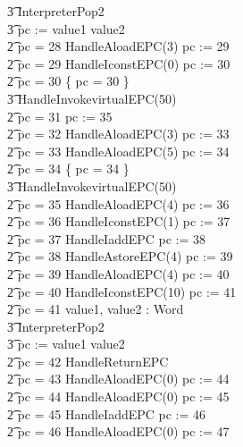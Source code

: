\begin{figure}[tp!]
\begin{minipage}{0.5\textwidth}
{\begin{circus}
    \t3 InterpreterPop2 \circseq \\
    \t3 pc := \IF value1 \leq value2   \\
    \t2 {} \circelse pc = 28 \circthen HandleAloadEPC(3) \circseq pc := 29 \\
    \t2 {} \circelse pc = 29 \circthen HandleIconstEPC(0) \circseq pc := 30 \\
    \t2 {} \circelse pc = 30 \circthen \{ pc = 30 \} \circseq \\
    \t3 HandleInvokevirtualEPC(50) \\
    \t2 {} \circelse pc = 31 \circthen pc := 35 \\
    \t2 {} \circelse pc = 32 \circthen HandleAloadEPC(3) \circseq pc := 33 \\
    \t2 {} \circelse pc = 33 \circthen HandleAloadEPC(5) \circseq pc := 34 \\
    \t2 {} \circelse pc = 34 \circthen \{ pc = 34 \} \circseq \\
    \t3 HandleInvokevirtualEPC(50) \\
    \t2 {} \circelse pc = 35 \circthen HandleAloadEPC(4) \circseq pc := 36 \\
    \t2 {} \circelse pc = 36 \circthen HandleIconstEPC(1) \circseq pc := 37 \\
    \t2 {} \circelse pc = 37 \circthen HandleIaddEPC \circseq pc := 38 \\
    \t2 {} \circelse pc = 38 \circthen HandleAstoreEPC(4) \circseq pc := 39 \\
    \t2 {} \circelse pc = 39 \circthen HandleAloadEPC(4) \circseq pc := 40 \\
    \t2 {} \circelse pc = 40 \circthen HandleIconstEPC(10) \circseq pc := 41 \\
    \t2 {} \circelse pc = 41 \circthen \circvar value1, value2 : Word \circspot \\
    \t3 InterpreterPop2 \circseq \\
    \t3 pc := \IF value1 \leq value2   \\
    \t2 {} \circelse pc = 42 \circthen HandleReturnEPC \\
    \t2 {} \circelse pc = 43 \circthen HandleAloadEPC(0) \circseq pc := 44 \\
    \t2 {} \circelse pc = 44 \circthen HandleAloadEPC(0) \circseq pc := 45 \\
    \t2 {} \circelse pc = 45 \circthen HandleIaddEPC \circseq pc := 46 \\
    \t2 {} \circelse pc = 46 \circthen HandleAloadEPC(0) \circseq pc := 47 \\

\end{circus}}
\end{minipage}
\end{figure}
